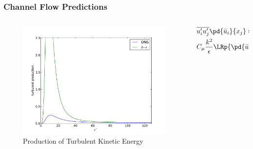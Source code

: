 \documentclass{beamer}
\begin{document}
\begin{frame}\frametitle{Channel Flow Predictions}
\begin{columns}[c]
\begin{column}{0.7\textwidth}
\begin{figure}[t]
	\begin{center}
		\includegraphics[width=\textwidth]{Production.pdf}
	\end{center}
	\caption{Production of Turbulent Kinetic Energy}
\end{figure}
\end{column}
\hspace{-3em}
\begin{column}{0.3\textwidth}
\begin{align*}
&\overline{u_i'u_j'}\pd{\bar u_i}{x_j}\approx\\
&C_\mu\frac{k^2}{\epsilon}\LRp{\pd{\bar u_i}{x_j}+\pd{\bar u_j}{x_i}}\pd{\bar u_i}{x_j}
\end{align*}
\end{column}
\end{columns}
\end{frame}
\end{document}

